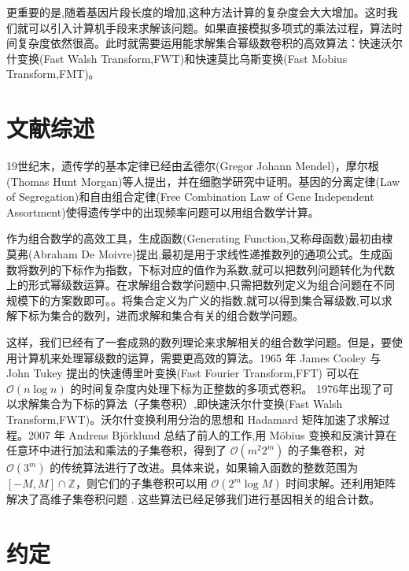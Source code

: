 \documentclass{article}
\begin{document}
更重要的是,随着基因片段长度的增加,这种方法计算的复杂度会大大增加。这时我们就可以引入计算机手段来求解该问题。如果直接模拟多项式的乘法过程，算法时间复杂度依然很高。此时就需要运用能求解集合幂级数卷积的高效算法：快速沃尔什变换(Fast Walsh Transform,FWT)和快速莫比乌斯变换(Fast Mobius Transform,FMT)。


\section{文献综述}

19世纪末，遗传学的基本定律已经由孟德尔(Gregor Johann Mendel)，摩尔根(Thomas Hunt Morgan)等人提出，并在细胞学研究中证明。基因的分离定律(Law of Segregation)和自由组合定律(Free Combination Law of Gene Independent Assortment)使得遗传学中的出现频率问题可以用组合数学计算。\cite{2009陈阅增普通生物学}

作为组合数学的高效工具，生成函数(Generating Function,又称母函数)最初由棣莫弗(Abraham De Moivre)提出,最初是用于求线性递推数列的通项公式。\cite{knuth2005art}生成函数将数列的下标作为指数，下标对应的值作为系数,就可以把数列问题转化为代数上的形式幂级数运算。在求解组合数学问题中,只需把数列定义为组合问题在不同规模下的方案数即可。\cite{graham1989concrete}。将集合定义为广义的指数,就可以得到集合幂级数,可以求解下标为集合的数列，进而求解和集合有关的组合数学问题。

这样，我们已经有了一套成熟的数列理论来求解相关的组合数学问题。但是，要使用计算机来处理幂级数的运算，需要更高效的算法。1965 年 James Cooley 与 John Tukey 提出的快速傅里叶变换(Fast Fourier Transform,FFT)\cite{cooley1965algorithm} 可以在 $\mathcal{O}(n\log n)$ 的时间复杂度内处理下标为正整数的多项式卷积。
1976年出现了可以求解集合为下标的算法（子集卷积）,即快速沃尔什变换(Fast Walsh Transform,FWT)\cite{maslen1997generalized}。沃尔什变换利用分治的思想和 Hadamard 矩阵加速了求解过程\cite{coppersmith1987matrix}。2007 年 Andreas Björklund 总结了前人的工作,用 Möbius 变换和反演计算在任意环中进行加法和乘法的子集卷积，得到了 $\mathcal{O}(m^2 2^m)$ 的子集卷积，对 $\mathcal{O}(3^m)$ 的传统算法进行了改进。具体来说，如果输入函数的整数范围为 $[-M,M]\cap \mathbb{Z}$，则它们的子集卷积可以用 $\mathcal{O}(2^m\log M)$ 时间求解。还利用矩阵解决了高维子集卷积问题 \cite{10.1145/1250790.1250801}. 这些算法已经足够我们进行基因相关的组合计数。

\newpage

\section{约定}
\end{document}
